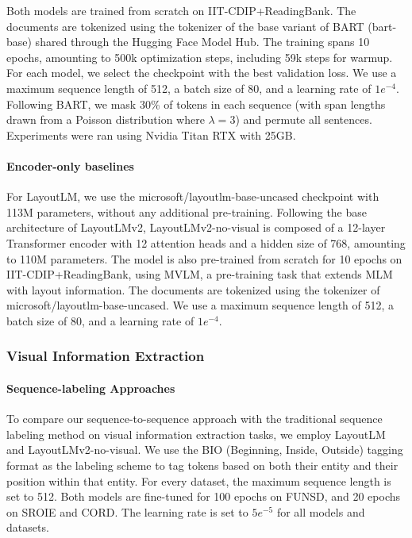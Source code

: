 Both models are trained from scratch on IIT-CDIP+ReadingBank. The documents are tokenized using the tokenizer of the base variant of \ac{BART} (bart-base) shared through the Hugging Face Model Hub. The training spans 10 epochs, amounting to 500k optimization steps, including 59k steps for warmup. For each model, we select the checkpoint with the best validation loss. We use a maximum sequence length of 512, a batch size of 80, and a learning rate of $1e^{-4}$. Following \ac{BART}, we mask 30\% of tokens in each sequence (with span lengths drawn from a Poisson distribution where $\lambda = 3$) and permute all sentences. Experiments were ran using Nvidia Titan RTX with 25GB. 

\paragraph{Encoder-only baselines} For LayoutLM, we use the microsoft/layoutlm-base-uncased checkpoint with 113M parameters, without any additional pre-training. Following the base architecture of LayoutLMv2, LayoutLMv2-no-visual is composed of a 12-layer Transformer encoder with 12 attention heads and a hidden size of 768, amounting to 110M parameters. The model is also pre-trained from scratch for 10 epochs on IIT-CDIP+ReadingBank, using \ac{MVLM}, a pre-training task that extends \ac{MLM} with layout information. The documents are tokenized using the tokenizer of microsoft/layoutlm-base-uncased. We use a maximum sequence length of 512, a batch size of 80, and a learning rate of $1e^{-4}$.


\subsubsection{Visual Information Extraction}

\paragraph{Sequence-labeling Approaches}

To compare our sequence-to-sequence approach with the traditional sequence labeling method on visual information extraction tasks, we employ LayoutLM and LayoutLMv2-no-visual. We use the BIO (Beginning, Inside, Outside) tagging format \citep{ramshaw1999text} as the labeling scheme to tag tokens based on both their entity and their position within that entity. For every dataset, the maximum sequence length is set to 512. Both models are fine-tuned for 100 epochs on FUNSD, and 20 epochs on SROIE and CORD. The learning rate is set to $5e^{-5}$ for all models and datasets.

